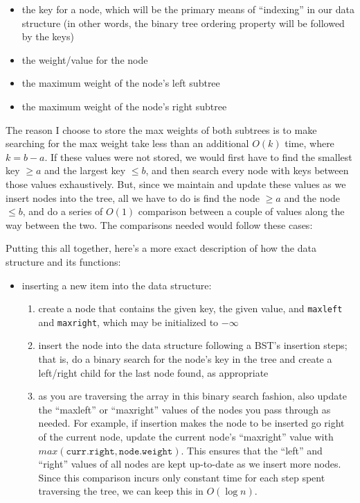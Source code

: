 \documentclass[12pt]{article}
\begin{document}
\begin{enumerate}
    \begin{itemize}
        \item the key for a node, which will be the primary means of ``indexing'' in our data structure (in other words, 
        the binary tree ordering property will be followed by the keys)
        \item the weight/value for the node
        \item the maximum weight of the node's left subtree
        \item the maximum weight of the node's right subtree
    \end{itemize}

    The reason I choose to store the max weights of both subtrees is to make searching for the max weight 
    take less than an additional $O(k)$ time, where $k = b - a$. If these values were not stored, we would first 
    have to find the smallest key $\geq a$ and the largest key $\leq b$, and then search every node with keys 
    between those values exhaustively. But, since we maintain and update these values as we insert nodes into the 
    tree, all we have to do is find the node $\geq a$ and the node $\leq b$, and do a series of $O(1)$ comparison between 
    a couple of values along the way between the two. The comparisons needed would follow these cases:

    Putting this all together, here's a more exact description of how the data structure and its functions:

    \begin{itemize}
        \item inserting a new item into the data structure:
        \begin{enumerate}
            \item create a node that contains the given key, the given value, and \texttt{maxleft} and \texttt{maxright}, which 
            may be initialized to $-\infty$
            \item insert the node into the data structure following a BST's insertion steps; that is, do a binary search 
            for the node's key in the tree and create a left/right child for the last node found, as appropriate
            \item as you are traversing the array in this binary search fashion, also update the ``maxleft'' or ``maxright'' values 
            of the nodes you pass through as needed. For example, if insertion makes the node to be inserted go right of the current node, 
            update the current node's ``maxright'' value with $max(\texttt{curr.right}, \texttt{node.weight})$. This 
            ensures that the ``left'' and ``right'' values of all nodes are kept up-to-date as we insert more nodes. 
            Since this comparison incurs only constant time for each step spent traversing the tree, we can keep this in 
            $O(\log n)$.
        \end{enumerate}


\end{itemize}
\end{enumerate}
\end{document}
